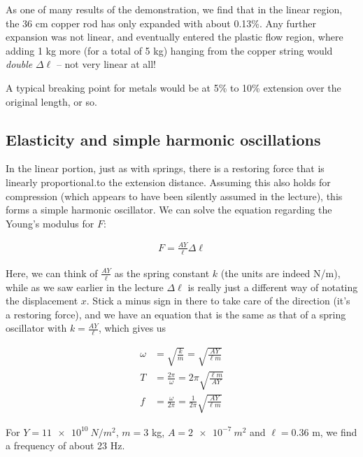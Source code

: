 As one of many results of the demonstration, we find that in the linear region, the 36 cm copper rod has only expanded with about 0.13\%. Any further expansion was not linear, and eventually entered the plastic flow region, where adding 1 kg more (for a total of 5 kg) hanging from the copper string would \emph{double} $\Delta \ell$ -- not very linear at all!

A typical breaking point for metals would be at 5\% to 10\% extension over the original length, or so.

\subsection{Elasticity and simple harmonic oscillations}

In the linear portion, just as with springs, there is a restoring force that is linearly proportional.to the extension distance. Assuming this also holds for compression (which appears to have been silently assumed in the lecture), this forms a simple harmonic oscillator. We can solve the equation regarding the Young's modulus for $F$:

\begin{align}
F = \frac{A Y}{\ell} \Delta \ell
\end{align}

Here, we can think of $\displaystyle \frac{A Y}{\ell}$ as the spring constant $k$ (the units are indeed N/m), while as we saw earlier in the lecture $\Delta \ell$ is really just a different way of notating the displacement $x$. Stick a minus sign in there to take care of the direction (it's a restoring force), and we have an equation that is the same as that of a spring oscillator with $\displaystyle k = \frac{A Y}{\ell}$, which gives us

\begin{align}
\omega &= \sqrt{\frac{k}{m}} = \sqrt{\frac{A Y}{\ell m}}\\
T &= \frac{2 \pi}{\omega} = 2 \pi \sqrt{\frac{\ell m}{A Y}}\\
f &= \frac{\omega}{2 \pi} = \frac{1}{2\pi} \sqrt{\frac{A Y}{\ell m}}
\end{align}

For $Y = \SI{11e10}{N/m^2}$, $m = 3$ kg, $A = \SI{2e-7}{m^2}$ and $\ell = 0.36$ m, we find a frequency of about 23 Hz.

